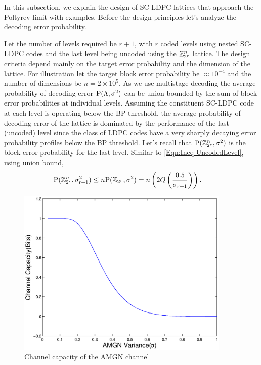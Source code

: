 \documentclass[journal,twocolumn]{IEEEtran}
\begin{document}
In this subsection, we explain the design of SC-LDPC lattices that approach the Poltyrev limit with examples. Before the design principles  let's analyze the decoding error probability.

Let the number of levels required be $r+1$, with $r$ coded levels using nested SC-LDPC codes and the last level being uncoded using the $\mathbb{Z}_{2^r}^{n}$ lattice. The design criteria depend mainly on the target error probability and the dimension of the lattice. For illustration let the  target block error probability be $\approx10^{-4}$ and the number of dimensions be $n=2 \times 10^{5}$.
As we use multistage decoding the average probability of decoding error $\text{P}(\Lambda,\sigma^{2})$ can be union bounded by the sum of block error probabilities at individual levels. Assuming the constituent SC-LDPC code at each level is operating below the BP threshold\cite{richardson2008modern}, the average probability of decoding error of the lattice is dominated by the performance of the last (uncoded) level since the class of LDPC codes have a very sharply decaying error probability profiles below the BP threshold. Let's recall that  $\text{P}(\mathbb{Z}_{2^r}^{n},\sigma^{2})$ is the block error probability for the last level. Similar to \eqref{Eqn:Ineq-UncodedLevel}, using union bound,
\begin{align}
\text{P}(\mathbb{Z}_{2^r}^{n},\sigma_{\text{r+1}}^{2})&\leq n\text{P}(\mathbb{Z}_{2^r},\sigma^{2})=n\left(2Q\left(\frac{0.5}{\sigma_{r+1}}\right)	\right).
\label{Eqn:ZLatticeProb}
\end{align}

\begin{figure}[!ht]
\centering
\includegraphics[width=4in]{../figures/Cap_integer_coset_lattice.eps}
\caption{Channel capacity of the AMGN channel}
\label{Fig:AMGNCapacity}
\end{figure}
\end{document}
